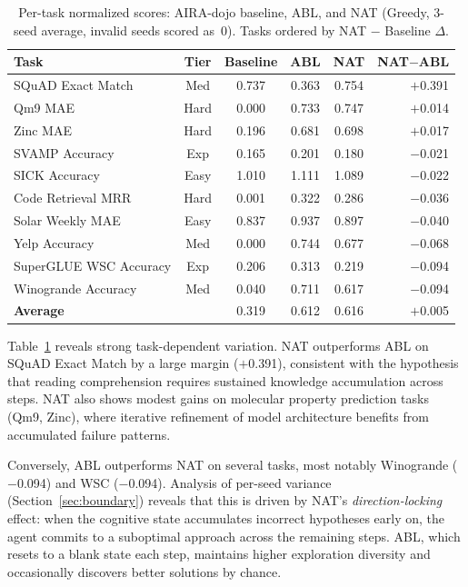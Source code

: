\documentclass{article} %
\begin{document}
\begin{table}[t]
\centering
\caption{Per-task normalized scores: AIRA-dojo baseline, ABL, and NAT
(Greedy, 3-seed average, invalid seeds scored as~0).
Tasks ordered by NAT $-$ Baseline $\Delta$.}
\label{tab:pertask}
\small
\begin{tabular}{@{}lccccr@{}}
\toprule
\textbf{Task} & \textbf{Tier} & \textbf{Baseline} & \textbf{ABL} &
\textbf{NAT} & \textbf{NAT$-$ABL} \\
\midrule
SQuAD Exact Match       & Med  & 0.737 & 0.363 & 0.754 & $+$0.391 \\
Qm9 MAE                & Hard & 0.000 & 0.733 & 0.747 & $+$0.014 \\
Zinc MAE               & Hard & 0.196 & 0.681 & 0.698 & $+$0.017 \\
SVAMP Accuracy          & Exp  & 0.165 & 0.201 & 0.180 & $-$0.021 \\
SICK Accuracy           & Easy & 1.010 & 1.111 & 1.089 & $-$0.022 \\
Code Retrieval MRR      & Hard & 0.001 & 0.322 & 0.286 & $-$0.036 \\
Solar Weekly MAE        & Easy & 0.837 & 0.937 & 0.897 & $-$0.040 \\
Yelp Accuracy           & Med  & 0.000 & 0.744 & 0.677 & $-$0.068 \\
SuperGLUE WSC Accuracy  & Exp  & 0.206 & 0.313 & 0.219 & $-$0.094 \\
Winogrande Accuracy     & Med  & 0.040 & 0.711 & 0.617 & $-$0.094 \\
\midrule
\textbf{Average}        &      & 0.319 & 0.612 & 0.616 & $+$0.005 \\
\bottomrule
\end{tabular}
\end{table}

Table~\ref{tab:pertask} reveals strong task-dependent variation.
NAT outperforms ABL on SQuAD Exact Match by a large margin ($+$0.391),
consistent with the hypothesis that reading comprehension requires sustained
knowledge accumulation across steps. NAT also shows modest gains on
molecular property prediction tasks (Qm9, Zinc), where iterative refinement
of model architecture benefits from accumulated failure patterns.

Conversely, ABL outperforms NAT on several tasks, most notably Winogrande
($-$0.094) and WSC ($-$0.094). Analysis of per-seed variance
(Section~\ref{sec:boundary}) reveals that this is driven by NAT's
\emph{direction-locking} effect: when the cognitive state accumulates
incorrect hypotheses early on, the agent commits to a suboptimal approach
across the remaining steps. ABL, which resets to a blank state each step,
maintains higher exploration diversity and occasionally discovers better
solutions by chance.
\end{document}
